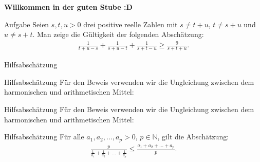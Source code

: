 \documentclass[10pt]{beamer}
\title{}
\author{Artur's \( \oint \) Mathematikstübchen}
\date{}
\def\bN{\mathbb{N}}
\begin{document}

\begin{frame}
    \begin{center}
        \textbf{\huge Willkommen in der guten Stube \newline \newline :D}
    \end{center}
\end{frame}




\begin{frame}
    \begin{alertblock}{Aufgabe}
        Seien \( s, t, u > 0 \) drei positive reelle Zahlen mit \( s \neq t + u \), \( t \neq s+ u \) und \( u \neq s + t \). Man zeige die Gültigkeit der folgenden Abschätzung:
        \begin{align*}
            \frac{1}{t + u - s} + \frac{1}{s + u - t} + \frac{1}{s + t - u}
            \geq \frac{9}{s + t + u}.
        \end{align*}
    \end{alertblock}
\end{frame}



\begin{frame}{Hilfsabschätzung}
    
\end{frame}



\begin{frame}{Hilfsabschätzung}
    Für den Beweis verwenden wir die Ungleichung zwischen dem harmonischen und arithmetischen Mittel:
\end{frame}



\begin{frame}{Hilfsabschätzung}
    Für den Beweis verwenden wir die Ungleichung zwischen dem harmonischen und arithmetischen Mittel:
    \begin{block}{Hilfsabschätzung}
        Für alle \( a_{1}, a_{2}, \ldots, a_{p} > 0 \), \( p \in \bN \), gilt die Abschätzung:
        \begin{align*}
            \frac{p}{\frac{1}{a_{1}} + \frac{1}{a_{2}} + \ldots + \frac{1}{a_{p}}}
            \leq \frac{a_{1} + a_{2} + \ldots + a_{p}}{p}.
        \end{align*}
    \end{block}
\end{frame}
\end{document}
